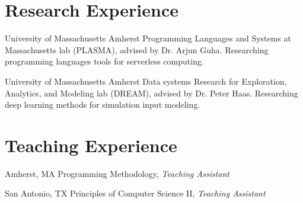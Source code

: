 \documentclass[10pt,letterpaper]{moderncv} %
\begin{document}

\section{Research Experience}

%
{University of Massachusetts Amherst}%
{}%
{}%
{Programming Languages and Systems at Massachusetts lab (PLASMA), advised by Dr.
Arjun Guha. Researching programming languages tools for serverless computing.
%
\newline{}
}

%
{University of Massachusetts Amherst}%
{}%
{}%
{Data systems Research for Exploration, Analytics, and Modeling lab (DREAM),
advised by Dr. Peter Haas. Researching deep learning methods for simulation input
modeling.
%
}


\section{Teaching Experience}

%
{Amherst, MA}%
{}%
{}%
{Programming Methodology, \textit{Teaching Assistant}
%
\newline{}
}

%
{San Antonio, TX}%
{}%
{}%
{Principles of Computer Science II, \textit{Teaching Assistant}
%
%
}
\end{document}
